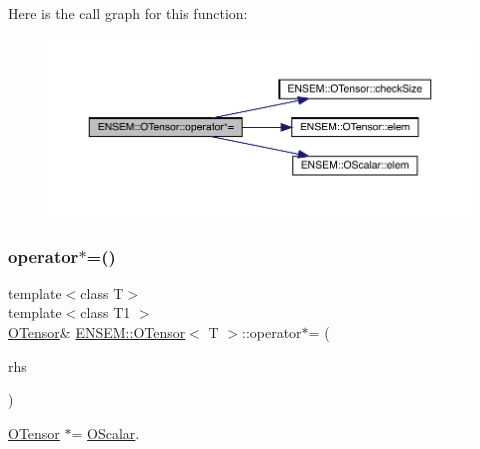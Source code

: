Here is the call graph for this function\+:
\nopagebreak
\begin{figure}[H]
\begin{center}
\leavevmode
\includegraphics[width=350pt]{da/d8a/classENSEM_1_1OTensor_a0326883980545068700bbdd762df5904_cgraph}
\end{center}
\end{figure}
\mbox{\label{classENSEM_1_1OTensor_a0326883980545068700bbdd762df5904}} 
\subsubsection{\texorpdfstring{operator$\ast$=()}{operator*=()}\hspace{0.1cm}{\footnotesize\ttfamily [3/6]}}
{\footnotesize\ttfamily template$<$class T$>$ \\
template$<$class T1 $>$ \\
\mbox{\hyperlink{classENSEM_1_1OTensor}{O\+Tensor}}\& \mbox{\hyperlink{classENSEM_1_1OTensor}{E\+N\+S\+E\+M\+::\+O\+Tensor}}$<$ T $>$\+::operator$\ast$= (\begin{DoxyParamCaption}\item[{const \mbox{\hyperlink{classENSEM_1_1OScalar}{O\+Scalar}}$<$ T1 $>$ \&}]{rhs }\end{DoxyParamCaption})\hspace{0.3cm}{\ttfamily [inline]}}



\mbox{\hyperlink{classENSEM_1_1OTensor}{O\+Tensor}} $\ast$= \mbox{\hyperlink{classENSEM_1_1OScalar}{O\+Scalar}}. 

